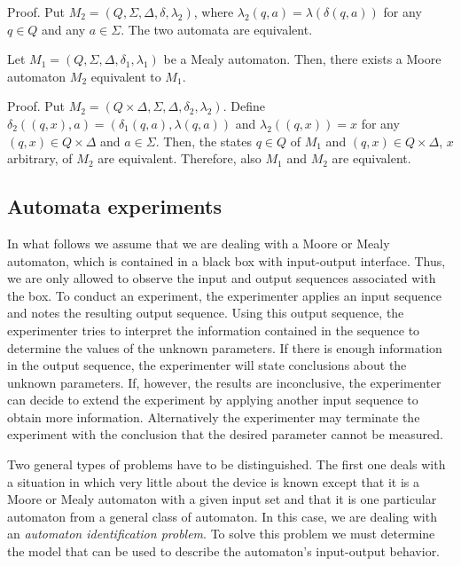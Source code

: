 Proof.
Put $M_2=(Q,\Sigma,\Delta,\delta,\lambda_2)$, where
$\lambda_2(q,a) = \lambda(\delta(q,a))$ for any $q \in Q$ and any
$a \in \Sigma$.
The two automata are equivalent.

\begin{theorem}
Let $M_1=(Q,\Sigma,\Delta,\delta_1,\lambda_1)$ be a Mealy automaton.
Then, there exists a Moore automaton $M_2$ equivalent to $M_1$.
\end{theorem}

Proof.
Put $M_2=(Q \times \Delta,\Sigma,\Delta,\delta_2,\lambda_2)$.
Define $\delta_2((q,x),a) = (\delta_1(q,a),\lambda(q,a))$ and
$\lambda_2((q,x))=x$ for any $(q,x) \in Q \times \Delta$
and $a \in \Sigma$.
Then, the states $q \in Q$ of $M_1$ and $(q,x) \in Q \times \Delta$, $x$ arbitrary,
of $M_2$ are equivalent. Therefore, also $M_1$ and $M_2$ are equivalent.

\subsection{Automata experiments}

In what follows we assume that we are dealing with a Moore or Mealy automaton,
which is contained in a black box
with input-output interface.
Thus, we are only allowed to observe
the input and output sequences associated with the box.
To conduct an experiment, the experimenter applies an input sequence
and notes the resulting output sequence.
Using this output sequence, the experimenter tries to interpret the information
contained in the sequence to determine the values of the
unknown parameters.
If there is enough information in the output sequence, the experimenter
will state
conclusions about the unknown parameters.
If, however, the results are inconclusive, the experimenter can decide to
extend the experiment by applying another input sequence to obtain
more information.
Alternatively the experimenter may terminate the experiment with the
conclusion that the desired parameter cannot be measured.

Two general types of problems have to be distinguished.
The first one deals with a situation in which very little
about the device is known
except that it is a Moore or Mealy automaton   with a given input set
and that it is one
particular automaton from a general class of automaton.
In this case, we are dealing with an {\em automaton identification
problem}.
To solve this problem we must determine the model that can be used to
describe the automaton's input-output behavior.

